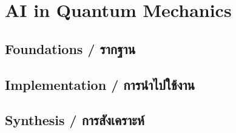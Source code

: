 \chapter{AI in Quantum Mechanics}
\label{ch:quantum_ai}

\section{Foundations \quad / \quad \textthai{รากฐาน}}



\section{Implementation \quad / \quad \textthai{การนำไปใช้งาน}}



\section{Synthesis \quad / \quad \textthai{การสังเคราะห์}}



